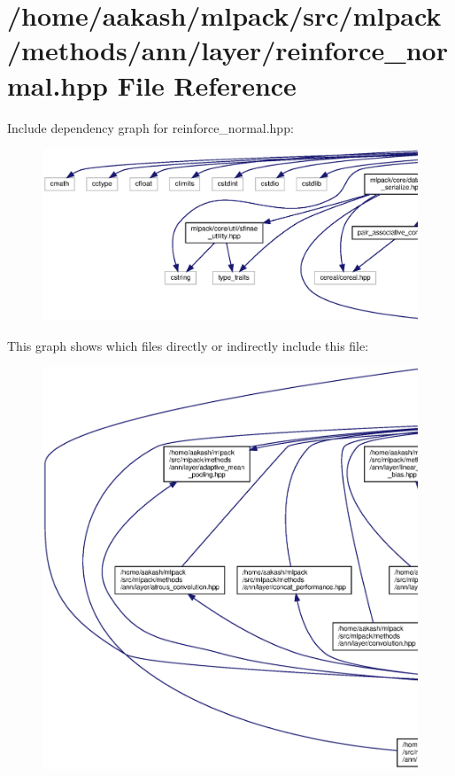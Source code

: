 \section{/home/aakash/mlpack/src/mlpack/methods/ann/layer/reinforce\+\_\+normal.hpp File Reference}
\label{reinforce__normal_8hpp}
Include dependency graph for reinforce\+\_\+normal.\+hpp\+:
\nopagebreak
\begin{figure}[H]
\begin{center}
\leavevmode
\includegraphics[width=350pt]{reinforce__normal_8hpp__incl}
\end{center}
\end{figure}
This graph shows which files directly or indirectly include this file\+:
\nopagebreak
\begin{figure}[H]
\begin{center}
\leavevmode
\includegraphics[width=350pt]{reinforce__normal_8hpp__dep__incl}
\end{center}
\end{figure}
